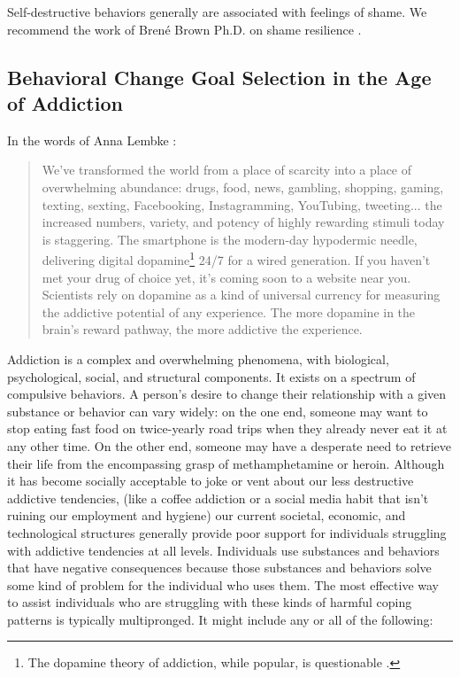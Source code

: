 \documentclass[12pt,letterpaper]{book}
\begin{document}
Self-destructive behaviors generally are associated with feelings of shame. We recommend the work of Brené Brown Ph.D. on shame resilience \cite{brownThought}.

\subsection*{Behavioral Change Goal Selection in the Age of Addiction}
In the words of Anna Lembke \cite{lembke2021dopamine}:
\begin{quotation}
    We've transformed the world from a place of scarcity into a place of overwhelming abundance: drugs, food, news, gambling, shopping, gaming, texting, sexting, Facebooking, Instagramming, YouTubing, tweeting... the increased numbers, variety, and potency of highly rewarding stimuli today is staggering. The smartphone is the modern-day hypodermic needle, delivering digital dopamine\footnote{The dopamine theory of addiction, while popular, is questionable \cite{nutt2015dopamine}.} 24/7 for a wired generation. If you haven't met your drug of choice yet, it's coming soon to a website near you. Scientists rely on dopamine as a kind of universal currency for measuring the addictive potential of any experience. The more dopamine in the brain's reward pathway, the more addictive the experience.
\end{quotation}

Addiction is a complex and overwhelming phenomena, with biological, psychological, social, and structural components. It exists on a spectrum of compulsive behaviors. A person's desire to change their relationship with a given substance or behavior can vary widely: on the one end, someone may want to stop eating fast food on twice-yearly road trips when they already never eat it at any other time. On the other end, someone may have a desperate need to retrieve their life from the encompassing grasp of methamphetamine or heroin. Although it has become socially acceptable to joke or vent about our less destructive addictive tendencies, (like a coffee addiction or a social media habit that isn't ruining our employment and hygiene) our current societal, economic, and technological structures generally provide poor support for individuals struggling with addictive tendencies at all levels. Individuals use substances and behaviors that have negative consequences because those substances and behaviors solve some kind of problem for the individual who uses them. The most effective way to assist individuals who are struggling with these kinds of harmful coping patterns is typically multipronged. It might include any or all of the following:
\end{document}
